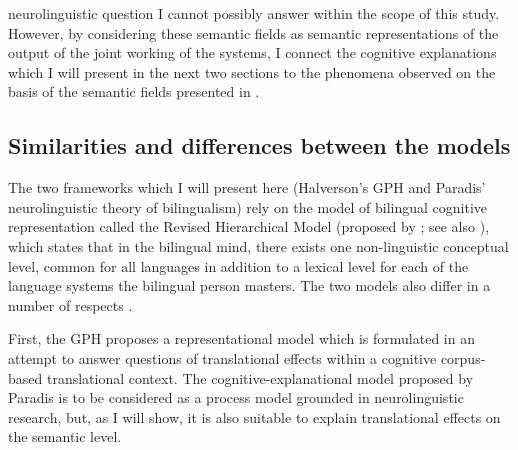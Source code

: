neurolinguistic question I cannot possibly answer within the scope of this study. However, by considering these semantic fields as semantic representations of the output of the joint working of the systems, I connect the cognitive explanations which I will present in the next two sections to the phenomena observed on the basis of the semantic fields presented in .

\subsection{Similarities and differences between the models}
\label{sec:5.1.3}  
The two frameworks which I will present here (Halverson’s GPH and Paradis’ neurolinguistic theory of bilingualism) rely on the model of bilingual cognitive representation called the Revised Hierarchical Model (proposed by \citealt{kroll_category_1994}; see also \citealt{brysbaert_is_2010,kroll_revised_2010}), which states that in the bilingual mind, there exists one non-linguistic conceptual level, common for all languages in addition to a lexical level for each of the language systems the bilingual person masters. The two models also differ in a number of respects \citep{cook_effects_2003}.

First, the GPH proposes a representational model which is formulated in an attempt to answer questions of translational effects within a cognitive corpus-based translational context. The cognitive-explanational model proposed by Paradis is to be considered as a process model grounded in neurolinguistic research, but, as I will show, it is also suitable to explain translational effects on the semantic level.

